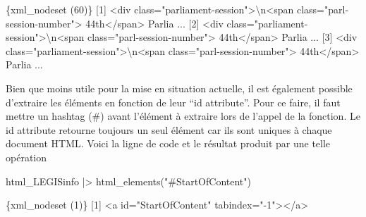 \documentclass[
  letterpaper,
  DIV=11,
  numbers=noendperiod]{scrreprt}
\newenvironment{Shaded}{\begin{snugshade}}{\end{snugshade}}
\newcommand{\DataTypeTok}[1]{\textcolor[rgb]{0.68,0.00,0.00}{#1}}
\newcommand{\ErrorTok}[1]{\textcolor[rgb]{0.68,0.00,0.00}{#1}}
\newcommand{\ExtensionTok}[1]{\textcolor[rgb]{0.00,0.23,0.31}{#1}}
\newcommand{\KeywordTok}[1]{\textcolor[rgb]{0.00,0.23,0.31}{#1}}
\newcommand{\NormalTok}[1]{\textcolor[rgb]{0.00,0.23,0.31}{#1}}
\newcommand{\OperatorTok}[1]{\textcolor[rgb]{0.37,0.37,0.37}{#1}}
\newcommand{\StringTok}[1]{\textcolor[rgb]{0.13,0.47,0.30}{#1}}
\begin{document}
\begin{Shaded}
\begin{Highlighting}[]
\ExtensionTok{\{xml\_nodeset} \ErrorTok{(}\ExtensionTok{60}\KeywordTok{)}\ErrorTok{\}}
 \ExtensionTok{[1]} \OperatorTok{\textless{}}\NormalTok{div class=}\StringTok{"parliament{-}session"}\OperatorTok{\textgreater{}}\DataTypeTok{\textbackslash{}n}\OperatorTok{\textless{}}\NormalTok{span class=}\StringTok{"parl{-}session{-}number"}\OperatorTok{\textgreater{}}
 \ExtensionTok{44th}\OperatorTok{\textless{}}\NormalTok{/span}\OperatorTok{\textgreater{}}\NormalTok{ Parlia ...}
 \ExtensionTok{[2]} \OperatorTok{\textless{}}\NormalTok{div class=}\StringTok{"parliament{-}session"}\OperatorTok{\textgreater{}}\DataTypeTok{\textbackslash{}n}\OperatorTok{\textless{}}\NormalTok{span class=}\StringTok{"parl{-}session{-}number"}\OperatorTok{\textgreater{}}
 \ExtensionTok{44th}\OperatorTok{\textless{}}\NormalTok{/span}\OperatorTok{\textgreater{}}\NormalTok{ Parlia ...}
 \ExtensionTok{[3]} \OperatorTok{\textless{}}\NormalTok{div class=}\StringTok{"parliament{-}session"}\OperatorTok{\textgreater{}}\DataTypeTok{\textbackslash{}n}\OperatorTok{\textless{}}\NormalTok{span class=}\StringTok{"parl{-}session{-}number"}\OperatorTok{\textgreater{}}
 \ExtensionTok{44th}\OperatorTok{\textless{}}\NormalTok{/span}\OperatorTok{\textgreater{}}\NormalTok{ Parlia ...}
\end{Highlighting}
\end{Shaded}

Bien que moins utile pour la mise en situation actuelle, il est
également possible d'extraire les éléments en fonction de leur ``id
attribute''. Pour ce faire, il faut mettre un hashtag (\#) avant
l'élément à extraire lors de l'appel de la fonction. Le id attribute
retourne toujours un seul élément car ils sont uniques à chaque document
HTML. Voici la ligne de code et le résultat produit par une telle
opération

\begin{Shaded}
\begin{Highlighting}[]
\ExtensionTok{html\_LEGISinfo} \KeywordTok{|}\OperatorTok{\textgreater{}}\NormalTok{ html\_elements}\KeywordTok{(}\StringTok{"\#StartOfContent"}\KeywordTok{)}
\end{Highlighting}
\end{Shaded}

\begin{Shaded}
\begin{Highlighting}[]
\ExtensionTok{\{xml\_nodeset} \ErrorTok{(}\ExtensionTok{1}\KeywordTok{)}\ErrorTok{\}}
\ExtensionTok{[1]} \OperatorTok{\textless{}}\NormalTok{a id=}\StringTok{"StartOfContent"}\NormalTok{ tabindex=}\StringTok{"{-}1"}\OperatorTok{\textgreater{}\textless{}}\NormalTok{/a}\OperatorTok{\textgreater{}}
\end{Highlighting}
\end{Shaded}
\end{document}

